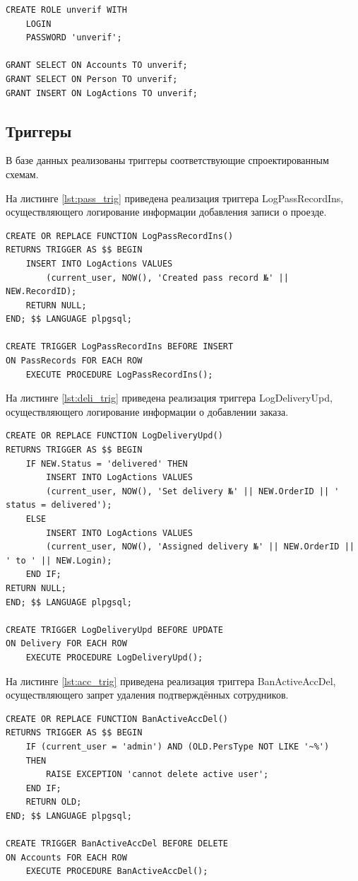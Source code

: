 \begin{lstlisting}[caption = {Релизация роли unverif}, label=lst:unverif_role]
CREATE ROLE unverif WITH
	LOGIN
	PASSWORD 'unverif';

GRANT SELECT ON Accounts TO unverif;
GRANT SELECT ON Person TO unverif;
GRANT INSERT ON LogActions TO unverif;
\end{lstlisting}


\subsection{Триггеры}
В базе данных реализованы триггеры соответствующие спроектированным схемам.

На листинге \ref{lst:pass_trig} приведена реализация триггера LogPassRecordIns, осуществляющего логирование информации добавления записи о проезде.
\begin{lstlisting}[caption = {Релизация триггера LogPassRecordIns}, label=lst:pass_trig]
CREATE OR REPLACE FUNCTION LogPassRecordIns()
RETURNS TRIGGER AS $$ BEGIN
	INSERT INTO LogActions VALUES 
		(current_user, NOW(), 'Created pass record №' || NEW.RecordID);
	RETURN NULL;
END; $$ LANGUAGE plpgsql;

CREATE TRIGGER LogPassRecordIns BEFORE INSERT
ON PassRecords FOR EACH ROW
	EXECUTE PROCEDURE LogPassRecordIns();
\end{lstlisting}

На листинге \ref{lst:deli_trig} приведена реализация триггера LogDeliveryUpd, осуществляющего логирование информации о добавлении заказа.
\begin{lstlisting}[caption = {Релизация триггера LogDeliveryUpd}, label=lst:deli_trig]
CREATE OR REPLACE FUNCTION LogDeliveryUpd()
RETURNS TRIGGER AS $$ BEGIN
	IF NEW.Status = 'delivered' THEN 
		INSERT INTO LogActions VALUES 
		(current_user, NOW(), 'Set delivery №' || NEW.OrderID || ' status = delivered');
	ELSE
		INSERT INTO LogActions VALUES 
		(current_user, NOW(), 'Assigned delivery №' || NEW.OrderID || ' to ' || NEW.Login);
	END IF;
RETURN NULL;
END; $$ LANGUAGE plpgsql;

CREATE TRIGGER LogDeliveryUpd BEFORE UPDATE
ON Delivery FOR EACH ROW
	EXECUTE PROCEDURE LogDeliveryUpd();
\end{lstlisting}

На листинге \ref{lst:acc_trig} приведена реализация триггера BanActiveAccDel, осуществляющего запрет удаления подтверждённых сотрудников.
\begin{lstlisting}[caption = {Релизация триггера BanActiveAccDel}, label=lst:acc_trig]
CREATE OR REPLACE FUNCTION BanActiveAccDel()
RETURNS TRIGGER AS $$ BEGIN
	IF (current_user = 'admin') AND (OLD.PersType NOT LIKE '~%') 
	THEN
		RAISE EXCEPTION 'cannot delete active user';
	END IF;
	RETURN OLD;
END; $$ LANGUAGE plpgsql;

CREATE TRIGGER BanActiveAccDel BEFORE DELETE
ON Accounts FOR EACH ROW
	EXECUTE PROCEDURE BanActiveAccDel();
\end{lstlisting}

